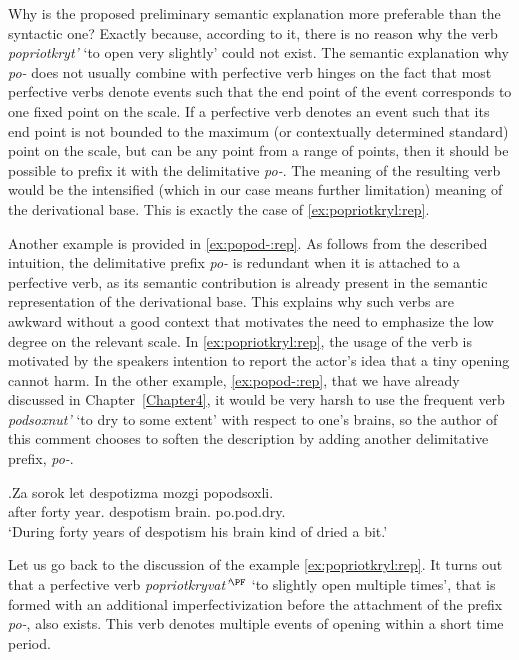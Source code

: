 Why is the proposed preliminary semantic explanation more preferable than the syntactic one? Exactly because, according to it, there is no reason why the verb \textit{popriotkryt'} `to open very slightly' could not exist. The semantic explanation why \textit{po-} does not usually combine with perfective verb hinges on the fact that most perfective verbs denote events such that the end point of the event corresponds to one fixed point on the scale. If a perfective verb denotes an event such that its end point is not bounded to the maximum (or contextually determined standard) point on the scale, but can be any point from a range of points, then it should be possible to prefix it with the delimitative \textit{po-}. The meaning of the resulting verb would be the intensified (which in our case means further limitation) meaning of the derivational base. This is exactly the case of \ref{ex:popriotkryl:rep}.

Another example is provided in \ref{ex:popod-:rep}. As follows from the described intuition, the delimitative prefix \textit{po-} is redundant when it is attached to a perfective verb, as its semantic contribution is already present in the semantic representation of the derivational base. This explains why such verbs are awkward without a good context that motivates the need to emphasize the low degree on the relevant scale. In \ref{ex:popriotkryl:rep}, the usage of the verb is motivated by the speakers intention to report the actor's idea that a tiny opening cannot harm. In the other example, \ref{ex:popod-:rep}, that we have already discussed in Chapter~\ref{Chapter4}, it would be very harsh to use the frequent verb \textit{podsoxnut'} `to dry to some extent' with respect to one's brains, so the author of this comment chooses to soften the description by adding another delimitative prefix, \textit{po-}. 

\exg.\label{ex:popod-:rep}Za sorok let despotizma mozgi popodsoxli.\\
after forty year. despotism brain. po.pod.dry.\\
\trans `During forty years of despotism his brain kind of dried a bit.'\\

Let us go back to the discussion of the example \ref{ex:popriotkryl:rep}. It turns out that a perfective verb \textit{popriotkryvat'}$^{\PF}$ `to slightly open multiple times', that is formed with an additional imperfectivization before the attachment of the prefix \textit{po-}, also exists. This verb denotes multiple events of opening within a short time period. 

